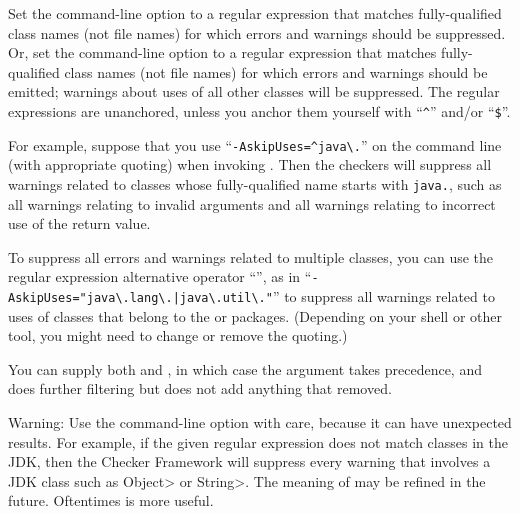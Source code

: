 Set the  command-line option to a
regular expression that matches fully-qualified class names (not file names) for which errors and warnings
should be suppressed.
Or, set the  command-line option to a
regular expression that matches fully-qualified class names (not file names) for which errors and warnings
should be emitted; warnings about uses of all other classes will be suppressed.
The regular expressions are unanchored, unless you anchor them yourself
with ``\codesize\verb|^|'' and/or ``\codesize\verb|$|''.

For example, suppose that you use
``{\codesize\verb|-AskipUses=^java\.|}'' on the command line
(with appropriate quoting) when invoking
.  Then the checkers will suppress all warnings related to
classes whose fully-qualified name starts with \codesize\verb|java.|, such
as all warnings relating to invalid arguments and all warnings relating to
incorrect use of the return value.

To suppress all errors and warnings related to multiple classes, you can use
the regular expression alternative operator ``\code{|}'', as in
``{\codesize\verb+-AskipUses="java\.lang\.|java\.util\."+}'' to suppress
all warnings related to uses of classes that belong to the  or
 packages.  (Depending on your shell or other tool, you
might need to change or remove the quoting.)

You can supply both  and , in which case
the  argument takes precedence, and  does
further filtering but does not add anything that  removed.

Warning:  Use the  command-line option with care,
because it can have unexpected results.  For example, if the
given regular expression does not match classes in the JDK, then the
Checker Framework will suppress every warning that involves a JDK class
such as \<Object> or \<String>.  The meaning of  may be
refined in the future.  Oftentimes  is more useful.




